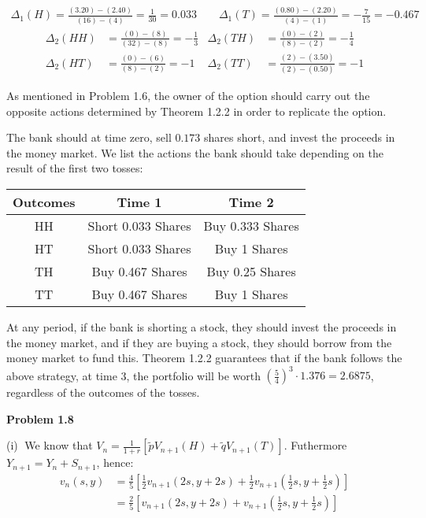 \documentclass[12pt, letterpaper]{article}
\begin{document}
\begin{align*}
    \Delta_1(H) = \frac{(3.20)-(2.40)}{(16)-(4)} = \frac{1}{30} = 0.033\quad \quad \Delta_1(T) = \frac{(0.80)-(2.20)}{(4)-(1)} = -\frac{7}{15} = -0.467
\end{align*}
\begin{align*}
    \Delta_2(HH) &= \frac{(0)-(8)}{(32) - (8)} = - \frac{1}{3} & \Delta_2(TH) &= \frac{(0)-(2)}{(8)-(2)} = - \frac{1}{4} \\
    \Delta_2(HT) &= \frac{(0)-(6)}{(8)-(2)} = -1 & \Delta_2(TT) &= \frac{(2)-(3.50)}{(2)-(0.50)} = -1
\end{align*}

As mentioned in Problem 1.6, the owner of the option should carry out the opposite actions determined by Theorem 1.2.2 in order to replicate the option.

\vspace{5mm}

The bank should at time zero, sell $0.173$ shares short, and invest the proceeds in the money market. We list the actions the bank should take depending on the result of the first two tosses:

\begin{center}
    \begin{tabular}{ c|c|c } 
        Outcomes & Time 1 & Time 2 \\
        \hline
        HH & Short 0.033 Shares & Buy 0.333 Shares  \\
        HT & Short 0.033 Shares  & Buy 1 Shares  \\
        TH & Buy 0.467 Shares & Buy 0.25 Shares  \\
        TT & Buy 0.467 Shares  & Buy 1 Shares 
    \end{tabular}
\end{center}

At any period, if the bank is shorting a stock, they should invest the proceeds in the money market, and if they are buying a stock, they should borrow from the money market to fund this.
Theorem 1.2.2 guarantees that if the bank follows the above strategy, at time 3, the portfolio will be worth $\left( \tfrac{5}{4} \right)^3 \cdot 1.376 = 2.6875$, regardless of the outcomes of the tosses.

\vspace{5mm}
\noindent
\textbf{Problem 1.8}

\vspace{5mm}
\noindent
(i)$\;$ We know that $V_n = \frac{1}{1+r}\left[\tilde p V_{n+1}(H)+\tilde q V_{n+1}(T)\right]$.
Futhermore $Y_{n+1} = Y_{n} + S_{n+1}$, hence:
\begin{align*}
    v_n(s,y) &= \tfrac{4}{5}\left[ \tfrac{1}{2}v_{n+1}(2s, y+2s) +\tfrac{1}{2}v_{n+1}\left(\tfrac{1}{2}s, y+\tfrac{1}{2}s\right) \right] \\
    &= \tfrac{2}{5} \left[ v_{n+1}(2s, y+2s) + v_{n+1}\left(\tfrac{1}{2}s, y+\tfrac{1}{2}s\right) \right]
\end{align*}
\end{document}
